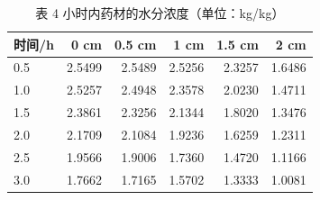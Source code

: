 \begin{table}[H]
\centering
\caption{表 4 小时内药材的水分浓度（单位：kg/kg）}
\label{tab:p2C}
\small
\begin{tabular}{@{}lrrrrr@{}}
\toprule
时间/h & 0 cm & 0.5 cm & 1 cm & 1.5 cm & 2 cm \\
\midrule
0.5 & 2.5499 & 2.5489 & 2.5256 & 2.3257 & 1.6486 \\
1.0 & 2.5257 & 2.4948 & 2.3578 & 2.0230 & 1.4711 \\
1.5 & 2.3861 & 2.3256 & 2.1344 & 1.8020 & 1.3476 \\
2.0 & 2.1709 & 2.1084 & 1.9236 & 1.6259 & 1.2311 \\
2.5 & 1.9566 & 1.9006 & 1.7360 & 1.4720 & 1.1166 \\
3.0 & 1.7662 & 1.7165 & 1.5702 & 1.3333 & 1.0081 \\
\bottomrule
\end{tabular}
\end{table}
